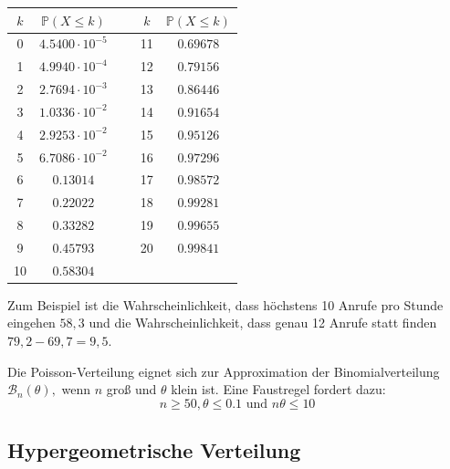 {\begin{bsp}
    \begin{center}
        \begin{tabular}{|cc|c|cc|}
            \hline
            $k$ & $\mathbb P(X\leq k)$ & ~ & $k$ & $\mathbb P(X\leq k)$ \\
            \hline
            0   & $4.5400 \cdot 10^{-5}$ & ~ & 11  & $0.69678$            \\
            1   & $4.9940 \cdot 10^{-4}$ & ~ & 12  & $0.79156$            \\
            2   & $2.7694 \cdot 10^{-3}$ & ~ & 13  & $0.86446$            \\
            3   & $1.0336 \cdot 10^{-2}$ & ~ & 14  & $0.91654$            \\
            4   & $2.9253 \cdot 10^{-2}$ & ~ & 15  & $0.95126$            \\
            5   & $6.7086 \cdot 10^{-2}$ & ~ & 16  & $0.97296$            \\
            6   & $0.13014             $ & ~ & 17  & $0.98572$            \\
            7   & $0.22022             $ & ~ & 18  & $0.99281$            \\
            8   & $0.33282             $ & ~ & 19  & $0.99655$            \\
            9   & $0.45793             $ & ~ & 20  & $0.99841$            \\
            10  & $0.58304             $ & ~ & ~   & ~                    \\
            \hline
        \end{tabular}
    \end{center}

    Zum Beispiel ist die Wahrscheinlichkeit, dass höchstens 10 Anrufe pro
    Stunde eingehen $58,3$ und die Wahrscheinlichkeit, dass genau 12 Anrufe statt finden
    $79,2-69,7=9,5$.

    \end{bsp}

    \begin{satz}
    Die Poisson-Verteilung eignet sich zur Approximation der
    Binomialverteilung $\mathcal B_{n}\left(\theta\right),$ wenn $n$ groß und 
    $\theta $ klein ist. Eine Faustregel fordert dazu:
    \[n\ge 50,\theta \le 0.1\text{ und }n\theta\le 10\]
    \end{satz}
    
    \bigskip


    \subsection{Hypergeometrische Verteilung}
    \label{sec:hypergeometrische_verteilung}


}
